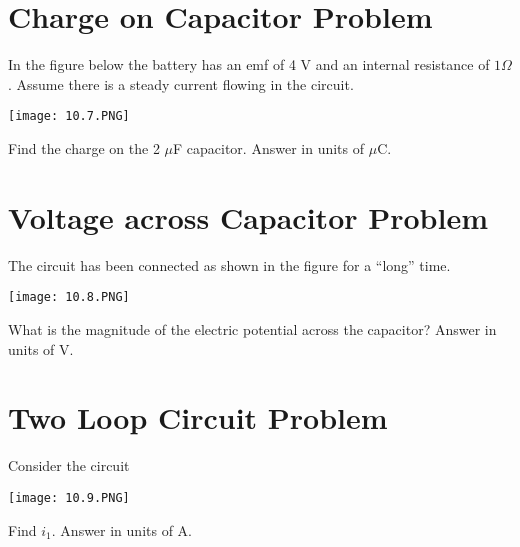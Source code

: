 \documentclass[../physics12.tex]{subfiles}
\begin{document}
\section{Charge on Capacitor Problem}
In the figure below the battery has an emf of 4 V and an internal resistance of $1 \Omega$. Assume there is a steady current flowing in the circuit.
\begin{center}
    \texttt{[image: 10.7.PNG]}
\end{center}
Find the charge on the 2 $\mu$F capacitor. Answer in units of $\mu$C.

\section{Voltage across Capacitor Problem}
The circuit has been connected as shown in the figure for a ``long'' time. 
\begin{center}
    \texttt{[image: 10.8.PNG]}
\end{center}
What is the magnitude of the electric potential across the capacitor? Answer in units of V.

\section{Two Loop Circuit Problem}
Consider the circuit
\begin{center}
    \texttt{[image: 10.9.PNG]}
\end{center}

Find $i_1$. Answer in units of A.
\end{document}
